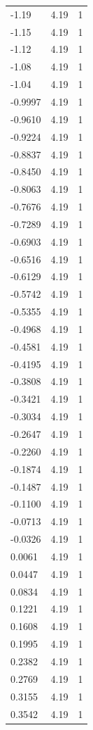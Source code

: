 \begin{longtable}{lrr}
  -1.19 & 4.19 & 1 \\
  -1.15 & 4.19 & 1 \\
  -1.12 & 4.19 & 1 \\
  -1.08 & 4.19 & 1 \\
  -1.04 & 4.19 & 1 \\
  -0.9997 & 4.19 & 1 \\
  -0.9610 & 4.19 & 1 \\
  -0.9224 & 4.19 & 1 \\
  -0.8837 & 4.19 & 1 \\
  -0.8450 & 4.19 & 1 \\
  -0.8063 & 4.19 & 1 \\
  -0.7676 & 4.19 & 1 \\
  -0.7289 & 4.19 & 1 \\
  -0.6903 & 4.19 & 1 \\
  -0.6516 & 4.19 & 1 \\
  -0.6129 & 4.19 & 1 \\
  -0.5742 & 4.19 & 1 \\
  -0.5355 & 4.19 & 1 \\
  -0.4968 & 4.19 & 1 \\
  -0.4581 & 4.19 & 1 \\
  -0.4195 & 4.19 & 1 \\
  -0.3808 & 4.19 & 1 \\
  -0.3421 & 4.19 & 1 \\
  -0.3034 & 4.19 & 1 \\
  -0.2647 & 4.19 & 1 \\
  -0.2260 & 4.19 & 1 \\
  -0.1874 & 4.19 & 1 \\
  -0.1487 & 4.19 & 1 \\
  -0.1100 & 4.19 & 1 \\
  -0.0713 & 4.19 & 1 \\
  -0.0326 & 4.19 & 1 \\
  0.0061 & 4.19 & 1 \\
  0.0447 & 4.19 & 1 \\
  0.0834 & 4.19 & 1 \\
  0.1221 & 4.19 & 1 \\
  0.1608 & 4.19 & 1 \\
  0.1995 & 4.19 & 1 \\
  0.2382 & 4.19 & 1 \\
  0.2769 & 4.19 & 1 \\
  0.3155 & 4.19 & 1 \\
  0.3542 & 4.19 & 1 \\

\end{longtable}
